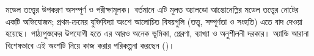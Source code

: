 \documentclass[../../include/open-logic-part]{subfiles}
\begin{document}

\begin{editorial}
  মডেল তত্ত্বের উপকরণ অসম্পূর্ণ ও পরীক্ষামূলক। বর্তমানে এটি মূলত
  অ্যালডো আন্তোনেল্লির মডেল তত্ত্বের নোটের একটি অভিযোজন; প্রথম-ক্রমের
  যুক্তিবিদ্যা অংশে আলোচিত বিষয়গুলি (তত্ত্ব, সম্পূর্ণতা ও সংহতি) এতে
  বাদ দেওয়া হয়েছে। পাঠ্যপুস্তকের উপযোগী হতে এর আরও অনেক ভূমিকা,
  প্রেরণা, ব্যাখ্যা ও অনুশীলনী দরকার। অ্যান্ডি আরানা বিশেষভাবে এই অংশটি
  নিয়ে কাজ করার পরিকল্পনা করছেন ()।
\end{editorial}





\OLEndPartHook
\end{document}
